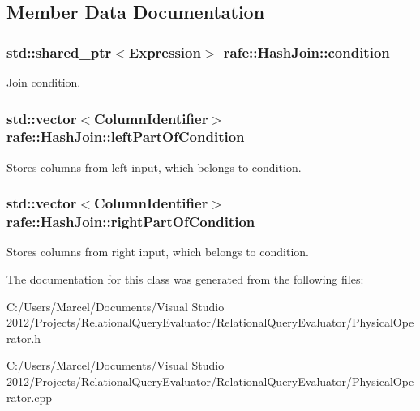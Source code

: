\subsection{Member Data Documentation}
\hypertarget{classrafe_1_1_hash_join_a0642b38448cb547c6b6a118002bc0dd8}{
\subsubsection[{condition}]{\setlength{\rightskip}{0pt plus 5cm}std\+::shared\+\_\+ptr$<${\bf Expression}$>$ rafe\+::\+Hash\+Join\+::condition}}\label{classrafe_1_1_hash_join_a0642b38448cb547c6b6a118002bc0dd8}
\hyperlink{classrafe_1_1_join}{Join} condition. \hypertarget{classrafe_1_1_hash_join_a7cc0d8d90cd314e40a0cc467954c91d1}{
\subsubsection[{left\+Part\+Of\+Condition}]{\setlength{\rightskip}{0pt plus 5cm}std\+::vector$<${\bf Column\+Identifier}$>$ rafe\+::\+Hash\+Join\+::left\+Part\+Of\+Condition}}\label{classrafe_1_1_hash_join_a7cc0d8d90cd314e40a0cc467954c91d1}
Stores columns from left input, which belongs to condition. \hypertarget{classrafe_1_1_hash_join_a8d6f385e17aa74f96d4ca7e66f09fac8}{
\subsubsection[{right\+Part\+Of\+Condition}]{\setlength{\rightskip}{0pt plus 5cm}std\+::vector$<${\bf Column\+Identifier}$>$ rafe\+::\+Hash\+Join\+::right\+Part\+Of\+Condition}}\label{classrafe_1_1_hash_join_a8d6f385e17aa74f96d4ca7e66f09fac8}
Stores columns from right input, which belongs to condition. 

The documentation for this class was generated from the following files\+:\begin{DoxyCompactItemize}
\item 
C\+:/\+Users/\+Marcel/\+Documents/\+Visual Studio 2012/\+Projects/\+Relational\+Query\+Evaluator/\+Relational\+Query\+Evaluator/Physical\+Operator.\+h\item 
C\+:/\+Users/\+Marcel/\+Documents/\+Visual Studio 2012/\+Projects/\+Relational\+Query\+Evaluator/\+Relational\+Query\+Evaluator/Physical\+Operator.\+cpp\end{DoxyCompactItemize}
